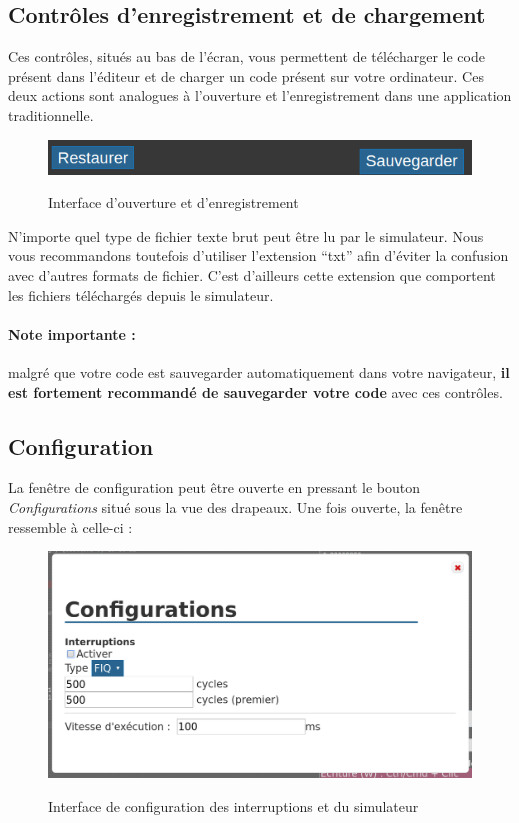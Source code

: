 \documentclass{tufte-handout}
\begin{document}
\clearpage
\subsection{Contrôles d'enregistrement et de chargement}

Ces contrôles, situés au bas de l'écran, vous permettent de télécharger le code présent dans l'éditeur et de charger un code présent sur votre ordinateur. Ces deux actions sont analogues à l'ouverture et l'enregistrement dans une application traditionnelle.

\begin{figure}[h!]
\raggedleft
\includegraphics[width=0.9\linewidth]{pics/opensave.png}
\label{f:opensave}
\caption{Interface d'ouverture et d'enregistrement}
\end{figure}

N'importe quel type de fichier texte brut peut être lu par le simulateur. Nous vous recommandons toutefois d'utiliser l'extension ``txt'' afin d'éviter la confusion avec d'autres formats de fichier. C'est d'ailleurs cette extension que comportent les fichiers téléchargés depuis le simulateur.

\paragraph{\textbf{Note importante :}}malgré que votre code est sauvegarder automatiquement dans votre navigateur, \textbf{il est fortement recommandé de sauvegarder votre code} avec ces contrôles.

\clearpage
\subsection{Configuration}

La fenêtre de configuration peut être ouverte en pressant le bouton \textit{Configurations} situé sous la vue des drapeaux. Une fois ouverte, la fenêtre ressemble à celle-ci :
\begin{figure}[h!]
\raggedleft
\includegraphics[width=0.9\linewidth]{pics/configurations.png}
\label{f:config}
\caption{Interface de configuration des interruptions et du simulateur}
\end{figure}
\end{document}
